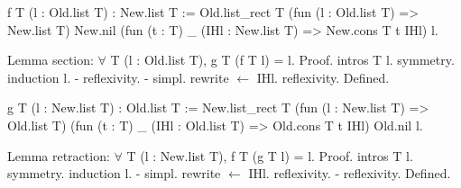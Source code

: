 f T (l : Old.list T) : New.list T :=
  Old.list_rect T
    (fun (l : Old.list T) => New.list T)
    New.nil
    (fun (t : T) _ (IHl : New.list T) =>
      New.cons T t IHl)
    l.

Lemma section:
  $\forall$ T (l : Old.list T), g T (f T l) = l.
Proof.
  intros T l. symmetry. induction l.
  - reflexivity.
  - simpl. rewrite $\leftarrow$ IHl. reflexivity.
Defined.

g T (l : New.list T) : Old.list T :=
  New.list_rect T
    (fun (l : New.list T) => Old.list T)
    (fun (t : T) _ (IHl : Old.list T) =>
      Old.cons T t IHl)
    Old.nil
    l.

Lemma retraction:
  $\forall$ T (l : New.list T), f T (g T l) = l.
Proof.
  intros T l. symmetry. induction l.
  - simpl. rewrite $\leftarrow$ IHl. reflexivity.
  - reflexivity.
Defined.
